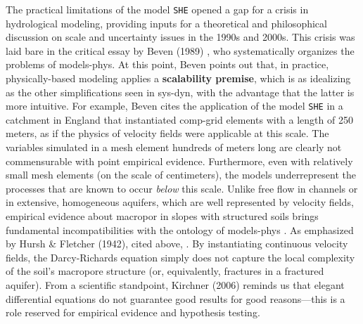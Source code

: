 \documentclass[./main_en.tex]{subfiles}
\begin{document}
\par The practical limitations of the \gls{model} \texttt{SHE} opened a gap for a crisis in hydrological modeling, providing inputs for a theoretical and philosophical discussion on scale and uncertainty issues in the 1990s and 2000s. This crisis was laid bare in the critical essay by Beven (1989) \cite{Beven1989a}, who systematically organizes the problems of \gls{models-phys}. At this point, Beven points out that, in practice, physically-based modeling applies a \textbf{scalability premise}, which is as idealizing as the other simplifications seen in \gls{sys-dyn}, with the advantage that the latter is more intuitive. For example, Beven cites the application of the \gls{model} \texttt{SHE} in a catchment in England that instantiated \gls{comp-grid} elements with a length of 250 meters, as if the physics of velocity fields were applicable at this scale. The variables simulated in a mesh element hundreds of meters long are clearly not commensurable with point empirical evidence. Furthermore, even with relatively small mesh elements (on the scale of centimeters), the models underrepresent the processes that are known to occur \textit{below} this scale. Unlike free flow in channels or in extensive, homogeneous aquifers, which are well represented by velocity fields, empirical evidence about \gls{macropor} in slopes with structured soils brings fundamental incompatibilities with the ontology of \gls{models-phys} \cite{Beven2013a, Beven2019a}. As emphasized by Hursh \& Fletcher (1942), cited above, . By instantiating continuous velocity fields, the Darcy-Richards equation simply does not capture the local complexity of the soil's macropore structure (or, equivalently, fractures in a fractured aquifer). From a scientific standpoint, Kirchner (2006) \cite{Kirchner2006a} reminds us that elegant differential equations do not guarantee good results for good reasons—this is a role reserved for empirical evidence and hypothesis testing.
\end{document}
